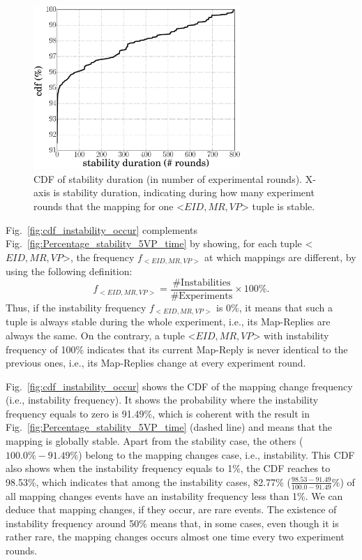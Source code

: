 \begin{figure}[t]
	\centering
    \includegraphics[width=0.7\textwidth]{Pics/cdf_stability_duration.eps}
	\caption{CDF of stability duration (in number of experimental rounds). X-axis is stability duration, indicating during how many experiment rounds that the mapping for one <$EID, MR, VP$> tuple is stable.}
	\label{fig:cdf_stability_duration}
\end{figure}

Fig.~\ref{fig:cdf_instability_occur} complements Fig.~\ref{fig:Percentage_stability_5VP_time} by showing, for each tuple <$EID, MR, VP$>, the frequency $f_{<EID, MR, VP>}$ at which mappings are different, by using the following definition: 
\begin{equation}
f_{<EID, MR, VP>} = \frac{\text{\# Instabilities}}{\text{\# Experiments}}\times100\%.
\end{equation}
Thus, if the instability frequency $f_{<EID, MR, VP>}$ is 0\%, it means that such a tuple is always stable during the whole experiment, i.e., its Map-Replies are always the same. On the contrary, a tuple <$EID, MR, VP$> with instability frequency of 100\% indicates that its current Map-Reply is never identical to the previous ones, i.e., its Map-Replies change at every experiment round.

Fig.~\ref{fig:cdf_instability_occur} shows the CDF of the mapping change frequency (i.e., instability frequency). It shows the probability where the instability frequency equals to zero is 91.49\%, which is coherent with the result in Fig.~\ref{fig:Percentage_stability_5VP_time} (dashed line) and means that the mapping is globally stable. Apart from the stability case, the others ($100.0\%-91.49\%$) belong to the mapping changes case, i.e., instability. This CDF also shows when the instability frequency equals to 1\%, the CDF reaches to 98.53\%, which indicates that among the instability cases, 82.77\% ($\frac{98.53-91.49}{100.0-91.49}\%$) of all mapping changes events have an instability frequency less than 1\%. We can deduce that mapping changes, if they occur, are rare events. The existence of instability frequency around 50\% means that, in some cases, even though it is rather rare, the mapping changes occurs almost one time every two experiment rounds.

